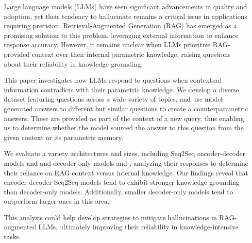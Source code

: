 Large language models (LLMs) have seen significant advancements in quality and adoption, yet their tendency to hallucinate remains a critical issue in applications requiring precision.
Retrieval-Augmented Generation (RAG) has emerged as a promising solution to this problem, leveraging external information to enhance response accuracy.
However, it remains unclear when LLMs prioritize RAG-provided context over their internal parametric knowledge, raising questions about their reliability in knowledge grounding.

This paper investigates how LLMs respond to questions when contextual information contradicts with their parametric knowledge.
We develop a diverse dataset featuring questions across a wide variety of topics, and use model-generated answers to different but similar questions to create a counterparametric answers.
These are provided as part of the context of a new query, thus enabling us to determine whether the model sourced the answer to this question from the given context or its parametric memory.

We evaluate a variety architectures and sizes, including Seq2Seq encoder-decoder models \smallflan{} and \bigflan{} and decoder-only models \smallllama{} and \bigllama{}, analyzing their responses to determine their reliance on RAG context versus internal knowledge.
Our findings reveal that encoder-decoder Seq2Seq models tend to exhibit stronger knowledge grounding than decoder-only models.
Additionally, smaller decoder-only models tend to outperform larger ones in this area.

This analysis could help develop strategies to mitigate hallucinations in RAG-augmented LLMs, ultimately improving their reliability in knowledge-intensive tasks.
